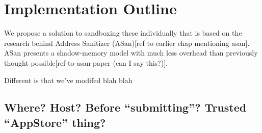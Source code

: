 \chapter {Implementation Outline}

We propose a solution to sandboxing these individually that is based on the
research behind Address Sanitizer (ASan)[ref to earlier chap mentioning asan].
ASan presents a shadow-memory model with much less overhead than previously 
thought possible[ref-to-asan-paper (can I say this?)].

Different is that we've modifed blah blah

\section {Where? Host? Before ``submitting''? Trusted ``AppStore'' thing?}
